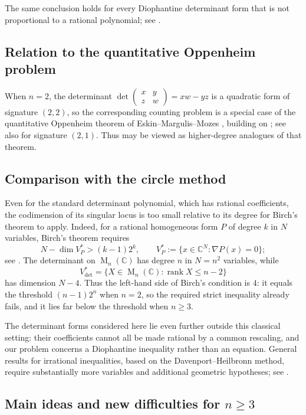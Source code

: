 \documentclass[reqno,11pt]{amsart}
\numberwithin{equation}{section}
\theoremstyle{definition}
\theoremstyle{remark}
\newcommand{\op}{\operatorname}
\newcommand{\M}{\op{M}}
\begin{document}
The same conclusion holds for every Diophantine determinant form that is not
proportional to a rational polynomial; see .


\subsection{Relation to the quantitative Oppenheim problem} When $n=2$, the determinant $\det\begin{pmatrix}x&y\\ z&w\end{pmatrix}=xw-yz $ is a quadratic form of signature
$(2,2)$, so the corresponding counting problem is a special case of the
quantitative Oppenheim theorem of Eskin--Margulis--Mozes
\cite{eskin-margulis-mozes:2005}, building on
\cite{dani-margulis:1993,eskin-margulis-mozes:1998}; see also \cite{Kim}
for signature $(2,1)$. Thus  may be viewed as
higher-degree analogues of that theorem.

\subsection{Comparison with the circle method}
\label{circle}
Even for the standard determinant polynomial, which has rational
coefficients, the codimension of its singular locus is too small relative
to its degree for Birch's theorem to apply. Indeed, for a rational
homogeneous form $P$ of degree $k$ in $N$ variables, Birch's theorem
requires
$$
N-\dim V_P^*>(k-1)2^k,
\qquad
V_P^*:=\{x\in\mathbb C^N:\nabla P(x)=0\};
$$
see \cite{birch:1962}. The determinant on $\M_n(\mathbb C)$ has degree
$n$ in $N=n^2$ variables, while
$$
V_{\det}^*
=
\{X\in\M_n(\mathbb C):\operatorname{rank}X\le n-2\}
$$
has dimension $N-4$. Thus the left-hand side of Birch's condition is $4$:
it equals the threshold $(n-1)2^n$ when $n=2$, so the required strict
inequality already fails, and it lies far below the threshold when
$n\ge3$.

The determinant forms considered here lie even further outside
this classical setting: their coefficients cannot all be made rational by a common rescaling, and
our problem concerns a Diophantine inequality rather than an equation.
General results for irrational inequalities, based on the
Davenport--Heilbronn method, require substantially more variables and
additional geometric hypotheses; see
\cite{RydinMyersonThesis,BrowningDH}.


\subsection{Main ideas and new difficulties for $n\ge3$}
\end{document}
